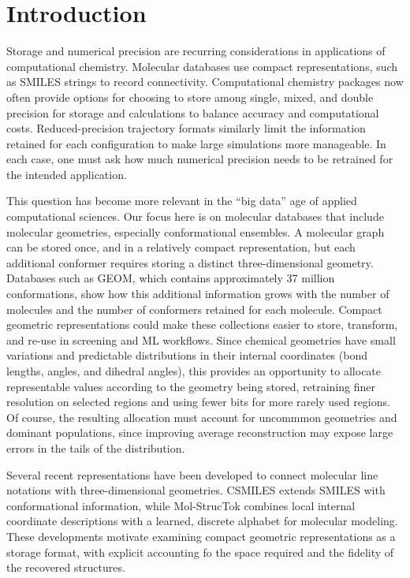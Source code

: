 \documentclass[%
 preprint,
superscriptaddress,
 amsmath,amssymb,
 aip,
 jcp,
]{revtex4-2}
\begin{document}
\section{Introduction}

Storage and numerical precision are recurring considerations in applications of computational chemistry. Molecular databases use compact representations, such as SMILES strings to record connectivity. Computational chemistry packages now often provide options for choosing to store among single, mixed, and double precision for storage and calculations to balance accuracy and computational costs. Reduced-precision trajectory formats similarly limit the information retained for each configuration to make large simulations more manageable. In each case, one must ask how much numerical precision needs to be retrained for the intended application.

This question has become more relevant in the ``big data'' age of applied computational sciences. Our focus here is on molecular databases that include molecular geometries, especially conformational ensembles. A molecular graph can be stored once, and in a relatively compact representation, but each additional conformer requires storing a distinct three-dimensional geometry. Databases such as GEOM, which contains approximately 37 million conformations, show how this additional information grows with the number of molecules and the number of conformers retained for each molecule. Compact geometric representations could make these collections easier to store, transform, and re-use in screening and ML workflows.
Since chemical geometries have small variations and predictable distributions in their internal coordinates (bond lengths, angles, and dihedral angles), this provides an opportunity to allocate representable values according to the geometry being stored, retraining finer resolution on selected regions and using fewer bits for more rarely used regions. Of course, the resulting allocation must account for uncommmon geometries and dominant populations, since improving average reconstruction may expose large errors in the tails of the distribution. 

Several recent representations have been developed to connect molecular line notations with three-dimensional geometries. CSMILES extends SMILES with conformational information, while Mol-StrucTok combines local internal coordinate descriptions with a learned, discrete alphabet for molecular modeling. These developments motivate examining compact geometric representations as a storage format, with explicit accounting fo the space required and the fidelity of the recovered structures.
\end{document}
